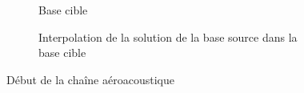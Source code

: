 \begin{figure}[H]
\begin{subfigure}[b]{0.23\textwidth}
        \caption{Base cible}
        \label{fig:aac2}
    \end{subfigure}
    \hfill
    \begin{subfigure}[b]{0.35\textwidth}
        \centering
        \caption{Interpolation de la solution de la base source dans la base cible}
        \label{fig:aac3}
    \end{subfigure}
    \caption{Début de la chaîne aéroacoustique}
    \label{fig:composite}
\end{figure}



